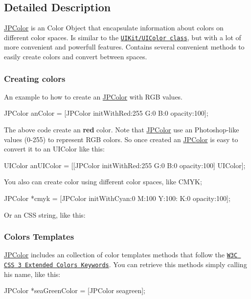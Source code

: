 \subsection{Detailed Description}
\hyperlink{interface_j_p_color}{JPColor} is an Color Object that encapsulate information about colors on different color spaces. Is similar to the \href{http://developer.apple.com/library/ios/#documentation/uikit/reference/UIColor_Class/Reference/Reference.html}{\tt UIKit/UIColor class}, but with a lot of more convenient and powerfull features. Contains several convenient methods to easily create colors and convert between spaces.

\subsubsection*{Creating colors }

An example to how to create an \hyperlink{interface_j_p_color}{JPColor} with RGB values. 
\begin{DoxyCode}
 JPColor anColor = [JPColor initWithRed:255 G:0 B:0 opacity:100];
\end{DoxyCode}
 The above code create an {\bfseries red} color. Note that \hyperlink{interface_j_p_color}{JPColor} use an Photoshop-\/like values (0-\/255) to represent RGB colors. So once created an \hyperlink{interface_j_p_color}{JPColor} is easy to convert it to an UIColor like this: 
\begin{DoxyCode}
 UIColor anUIColor = [[JPColor initWithRed:255 G:0 B:0 opacity:100] UIColor];
\end{DoxyCode}
 You also can create color using different color spaces, like CMYK; 
\begin{DoxyCode}
 JPColor *cmyk = [JPColor initWithCyan:0 M:100 Y:100: K:0 opacity:100];
\end{DoxyCode}
 Or an CSS string, like this: 


\subsubsection*{Colors Templates}

\hyperlink{interface_j_p_color}{JPColor} includes an collection of color templates methods that follow the \href{http://www.w3.org/TR/css3-color/#svg-color}{\tt W3C CSS 3 Extended Colors Keywords}. You can retrieve this methods simply calling his name, like this: 
\begin{DoxyCode}
 JPColor *seaGreenColor = [JPColor seagreen];
\end{DoxyCode}


